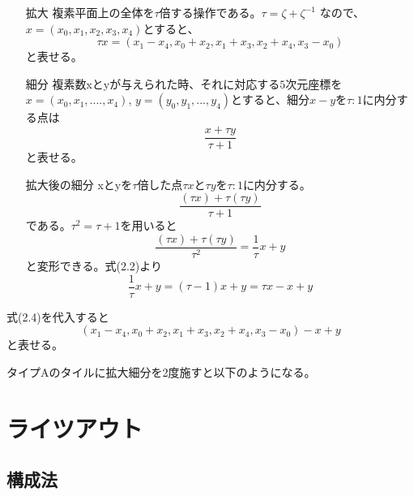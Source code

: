 \documentclass[uplatex,dvipdfmx]{ujreport}
\begin{document}
\begin{itemize}
 \item [拡大]
複素平面上の全体を$\tau$倍する操作である。$\tau=\zeta+\zeta^{-1}$
なので、$x=(x_0,x_1,x_2,x_3,x_4)$とすると、
\begin{equation}
 \tau x =(x_1-x_4, x_0+x_2, x_1+x_3, x_2+x_4, x_3-x_0)
\end{equation}
と表せる。

 \item [細分]
複素数xとyが与えられた時、それに対応する$5$次元座標を$x=(x_0,x_1,....,x_4)$,
$y=(y_0,y_1,...,y_4)$とすると、細分$x-y$を$\tau:1$に内分する点は
\begin{equation}
 \frac{x+\tau y}{\tau+1}
\end{equation}
と表せる。
\item [拡大後の細分]
xとyを$\tau$倍した点$\tau x$と$\tau y$を$\tau:1$に内分する。
\[
 \frac{(\tau x)+\tau(\tau y)}{\tau+1}
\]
である。$\tau^2=\tau+1$を用いると
\[
 \frac{(\tau x)+\tau(\tau y)}{\tau^2}=\frac{1}{\tau}x+y
\]
と変形できる。式(2.2)より
\[
 \frac{1}{\tau} x+y=(\tau-1)x+y
=\tau x-x+y
\]

\end{itemize}
式(2.4)を代入すると
\[
 (x_1-x_4, x_0+x_2, x_1+x_3, x_2+x_4, x_3-x_0)-x+y
\]
と表せる。

タイプAのタイルに拡大細分を2度施すと以下のようになる。
\begin{figure}[H]
\end{figure}


 
\chapter{ライツアウト}
\section{構成法}
\end{document}
